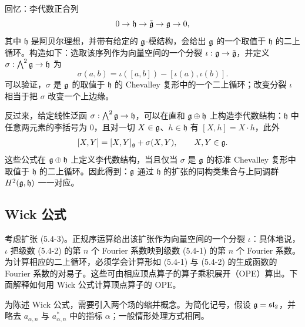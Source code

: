 回忆：李代数正合列
\[
0\to \mathfrak{h}\to \tilde{\mathfrak{g}}\to \mathfrak{g}\to 0,
\]
其中 $\mathfrak{h}$ 是阿贝尔理想，并带有给定的 $\mathfrak{g}$-模结构，会给出 $\mathfrak{g}$ 的一个取值于 $\mathfrak{h}$ 的二上循环。构造如下：选取该序列作为向量空间的一个分裂 $\iota: \mathfrak{g}\to\tilde{\mathfrak{g}}$，并定义 $\sigma: \bigwedge^2\mathfrak{g}\to\mathfrak{h}$ 为
\[
\sigma(a,b) = \iota([a,b]) - [\iota(a),\iota(b)].
\]
可以验证，$\sigma$ 是 $\mathfrak{g}$ 的取值于 $\mathfrak{h}$ 的 Chevalley 复形中的一个二上循环；改变分裂 $\iota$ 相当于把 $\sigma$ 改变一个上边缘。

反过来，给定线性泛函 $\sigma:\bigwedge^2\mathfrak{g}\to\mathfrak{h}$，可以在直和 $\mathfrak{g}\oplus\mathfrak{h}$ 上构造李代数结构：$\mathfrak{h}$ 中任意两元素的李括号为 0，且对一切 $X\in\mathfrak{g}$、$h\in\mathfrak{h}$ 有 $[X,h] = X\cdot h$，此外
\[
[X,Y] = [X,Y]_{\mathfrak{g}} + \sigma(X,Y),\qquad X,Y\in\mathfrak{g}.
\]
这些公式在 $\mathfrak{g}\oplus\mathfrak{h}$ 上定义李代数结构，当且仅当 $\sigma$ 是 $\mathfrak{g}$ 的标准 Chevalley 复形中取值于 $\mathfrak{h}$ 的二上循环。因此得到：$\mathfrak{g}$ 通过 $\mathfrak{h}$ 的扩张的同构类集合与上同调群 $H^2(\mathfrak{g},\mathfrak{h})$ 一一对应。


\subsection{Wick 公式}

考虑扩张 (5.4-3)。正规序运算给出该扩张作为向量空间的一个分裂 $\iota$：具体地说，$\iota$ 把级数 (5.4-2) 的第 $n$ 个 Fourier 系数映到级数 (5.4-1) 的第 $n$ 个 Fourier 系数。为计算相应的二上循环，必须学会计算形如 (5.4-1) 与 (5.4-2) 的生成函数的 Fourier 系数的对易子。这些可由相应顶点算子的算子乘积展开（OPE）算出。下面解释如何用 Wick 公式计算顶点算子的 OPE。

为陈述 Wick 公式，需要引入两个场的缩并概念。为简化记号，假设 $\mathfrak{g}=\mathfrak{sl}_2$，并略去 $a_{\alpha,n}$ 与 $a^*_{\alpha,n}$ 中的指标 $\alpha$；一般情形处理方式相同。

